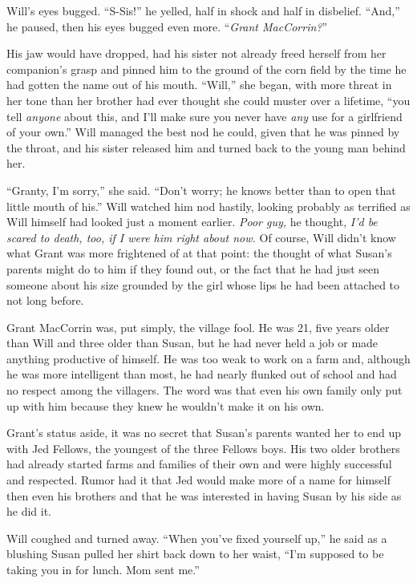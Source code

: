 \documentclass[12pt,letterpaper,oneside,english]{book}
\begin{document}
Will's eyes bugged. ``S-Sis!'' he yelled, half in shock and half in
disbelief. ``And,'' he paused, then his eyes bugged even more.
``\emph{Grant MacCorrin?}''

His jaw would have dropped, had his sister not already freed herself from
her companion's grasp and pinned him to the ground of the corn field by
the time he had gotten the name out of his mouth. ``Will,'' she began,
with more threat in her tone than her brother had ever thought she could
muster over a lifetime, ``you tell \emph{anyone} about this, and I'll make
sure you never have \emph{any} use for a girlfriend of your own.'' Will
managed the best nod he could, given that he was pinned by the throat, and
his sister released him and turned back to the young man behind her. 

``Granty, I'm sorry,'' she said. ``Don't worry; he knows better than to
open that little mouth of his.'' Will watched him nod hastily, looking
probably as terrified as Will himself had looked just a moment earlier.
\textit{Poor guy,} he thought, \textit{I'd be scared to death, too, if I
were him right about now.} Of course, Will didn't know what Grant was more
frightened of at that point: the thought of what Susan's parents might do
to him if they found out, or the fact that he had just seen someone about
his size grounded by the girl whose lips he had been attached to not long
before.

Grant MacCorrin was, put simply, the village fool. He was 21, five years
older than Will and three older than Susan, but he had never held a job or
made anything productive of himself. He was too weak to work on a farm
and, although he was more intelligent than most, he had nearly flunked out
of school and had no respect among the villagers. The word was that even
his own family only put up with him because they knew he wouldn't make it
on his own.

Grant's status aside, it was no secret that Susan's parents wanted her to
end up with Jed Fellows, the youngest of the three Fellows boys. His two
older brothers had already started farms and families of their own and
were highly successful and respected. Rumor had it that Jed would make
more of a name for himself then even his brothers and that he was
interested in having Susan by his side as he did it. 

Will coughed and turned away. ``When you've fixed yourself up,'' he said
as a blushing Susan pulled her shirt back down to her waist, ``I'm
supposed to be taking you in for lunch. Mom sent me.''
\end{document}
